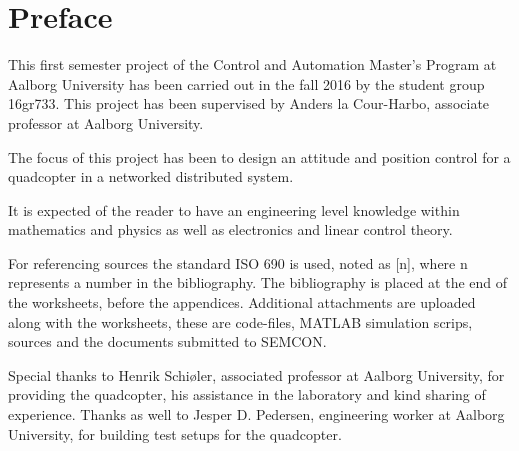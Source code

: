 
\chapter*{Preface}
This first semester project of the Control and Automation Master's Program at Aalborg University has been carried out in the fall 2016 by the student group 16gr733. This project has been supervised by Anders la Cour-Harbo, associate professor at Aalborg University.

The focus of this project has been to design an attitude and position control for a quadcopter in a networked distributed system. 

It is expected of the reader to have an engineering level knowledge within mathematics and physics as well as electronics and linear control theory.

For referencing sources the standard ISO 690 is used, noted as [n], where n represents a number in the bibliography. The bibliography is placed at the end of the worksheets, before the appendices. Additional attachments are uploaded along with the worksheets, these are code-files, MATLAB simulation scrips, sources and the documents submitted to SEMCON.

Special thanks to Henrik Schiøler, associated professor at Aalborg University, for providing the quadcopter, his assistance in the laboratory and kind sharing of experience. Thanks as well to Jesper D. Pedersen, engineering worker at Aalborg University, for building test setups for the quadcopter. 

%
%


